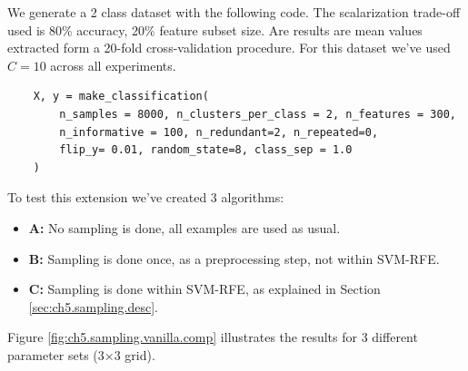We generate a 2 class dataset with the following code. The scalarization trade-off used is 80\% accuracy, 20\% feature subset size. Are results are mean values extracted form a 20-fold cross-validation procedure. For this dataset we've used $C = 10$ across all experiments.

\begin{verbatim}
    X, y = make_classification(
        n_samples = 8000, n_clusters_per_class = 2, n_features = 300, 
        n_informative = 100, n_redundant=2, n_repeated=0,
        flip_y= 0.01, random_state=8, class_sep = 1.0
    )
\end{verbatim}\VS

To test this extension we've created 3 algorithms:

\begin{itemize}
    \item \textbf{A:} No sampling is done, all examples are used as usual.
    \item \textbf{B:} Sampling is done once, as a preprocessing step, not within SVM-RFE.
    \item \textbf{C:} Sampling is done within SVM-RFE, as explained in Section \ref{sec:ch5.sampling.desc}. 
\end{itemize}

Figure \ref{fig:ch5.sampling.vanilla.comp} illustrates the results for 3 different parameter sets (3×3 grid).


